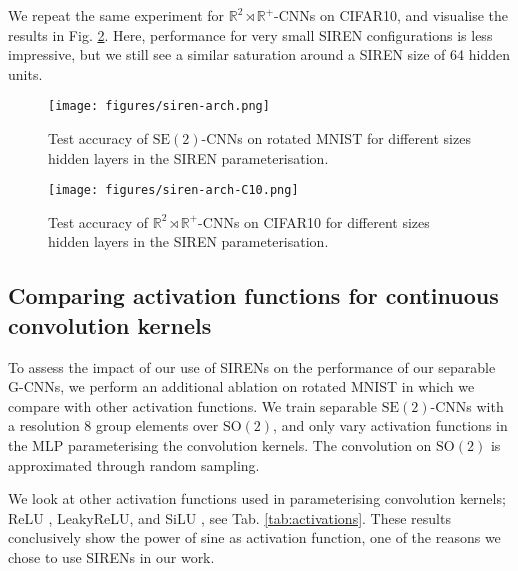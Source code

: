 \documentclass[nohyperref]{article}
\theoremstyle{plain}
\theoremstyle{definition}
\theoremstyle{remark}
\begin{document}
We repeat the same experiment for $\mathbb{R}^2\rtimes \mathbb{R}^+$-CNNs on CIFAR10, and visualise the results in Fig. \ref{fig:siren-arch-c10}. Here, performance for very small SIREN configurations is less impressive, but we still see a similar saturation around a SIREN size of 64 hidden units.

\begin{figure}
\centering
  \texttt{[image: figures/siren-arch.png]}
  \captionsetup{width=.9\linewidth}
  \caption{Test accuracy of $\mathrm{SE(2)}$-CNNs on rotated MNIST for different sizes hidden layers in the SIREN parameterisation.}
  \label{fig:siren-arch}
\end{figure}
\begin{figure}
\centering
  \texttt{[image: figures/siren-arch-C10.png]}
  \captionsetup{width=.9\linewidth}
  \caption{Test accuracy of $\mathbb{R}^2\rtimes \mathbb{R}^+$-CNNs on CIFAR10 for different sizes hidden layers in the SIREN parameterisation.}
  \label{fig:siren-arch-c10}
\end{figure}


\subsection{Comparing activation functions for continuous convolution kernels} \label{app:activationfunctions}
To assess the impact of our use of SIRENs on the performance of our separable G-CNNs, we perform an additional ablation on rotated MNIST in which we compare with other activation functions. We train separable $\mathrm{SE(2)}$-CNNs with a resolution 8 group elements over $\mathrm{SO(2)}$, and only vary activation functions in the MLP parameterising the convolution kernels. The convolution on $\mathrm{SO(2)}$ is approximated through random sampling.

We look at other activation functions used in parameterising convolution kernels; ReLU \citep{wu2019pointconv}, LeakyReLU, and SiLU \citep{finzi2020generalizing}, see Tab. \ref{tab:activations}. These results conclusively show the power of sine as activation function, one of the reasons we chose to use SIRENs in our work.
\end{document}
